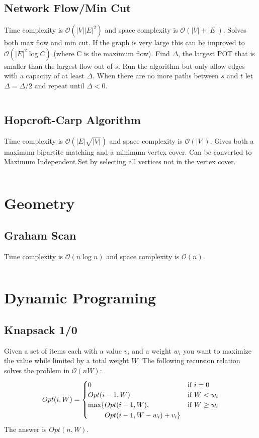 \documentclass[8pt,a4paper,landscape,oneside]{amsart}
\newcommand{\code}[1]{\inputminted[fontsize=\normalsize,baselinestretch=1]{java}{code/#1}}
\newcommand{\bigO}{\mathcal{O}}
\begin{document}
\begin{multicols*}{3}
  \subsection{Network Flow/Min Cut}
  Time complexity is $\bigO(|V||E|^2)$ and space complexity is $\bigO(|V|+|E|)$. Solves both max flow and min cut. If the graph is very large this can be improved to $\bigO(|E|^2 \log{C})$ (where C is the maximum flow). Find $\Delta$, the largest POT that is smaller than the largest flow out of $s$. Run the algorithm but only allow edges with a capacity of at least $\Delta$. When there are no more paths between $s$ and $t$ let $\Delta = \Delta / 2$ and repeat until $\Delta < 0$.
  \code{Graphs/NetworkFlow.java}
  
  \subsection{Hopcroft-Carp Algorithm}
  Time complexity is $\bigO(|E|\sqrt{|V|})$ and space complexity is $\bigO(|V|)$. Gives both a maximum bipartite matching and a minimum vertex cover. Can be converted to Maximum Independent Set by selecting all vertices not in the vertex cover.
  \code{Graphs/HopcroftCarp.java}
  
  
\section{Geometry}
  \subsection{Graham Scan}
  Time complexity is $\bigO(n\log{n})$ and space complexity is $\bigO(n)$.
  \code{Geometry/GrahamScan.java}
  
\section{Dynamic Programing}
  \subsection{Knapsack 1/0}
  Given a set of items each with a value $v_i$ and a weight $w_i$ you want to maximize the value while limited by a total weight $W$. The following recursion relation solves the problem in $\bigO(nW)$:
  \[
  Opt(i,W) = \begin{cases}
  0 & \text{if } i=0 \\
  Opt(i-1,W) & \text{if } W<w_i \\
  \begin{aligned}[t]\arraycolsep=0pt
    \max\lbrace &
      Opt(i-1,W), \\ &
      Opt(i-1,W-w_i) + v_i \rbrace
  \end{aligned} & \text{if } W \geq w_i
  \end{cases}
  \]
  The answer is $Opt(n, W)$.
  

\end{multicols*}
\end{document}
